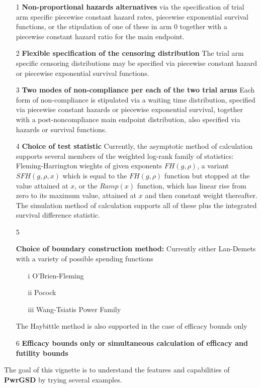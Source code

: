 \documentclass{article}
\begin{document}
\begin{itemize}
  \item[1]{{\bf Non-proportional hazards alternatives}
      via the specification of trial arm specific piecewise constant hazard rates, 
      piecewise exponential survival functions, or the stipulation of one of these
      in arm 0 together with a piecewise constant hazard ratio for the main endpoint.}
  \item[2]{{\bf Flexible specification of the censoring distribution}
      The trial arm specific censoring distributions may be specified via piecewise constant
      hazard or piecewise exponential survival functions.}
  \item[3]{{\bf Two modes of non-compliance per each of the two trial arms}
      Each form of non-compliance is stipulated via a waiting time distribution, specified via
      piecewise constant hazards or piecewise exponential survival, together with a post-noncompliance
      main endpoint distribution, also specified via hazards or survival functions.}      
  \item[4]{{\bf Choice of test statistic}
      Currently, the asymptotic method of calculation supports several members of the weighted log-rank
      family of statistics: Fleming-Harrington wieghts of given exponents $FH(g, \rho)$, a
      variant $SFH(g,\rho,x)$ which is equal to the $FH(g, \rho)$ function but stopped at the value
      attained at $x$, or the $Ramp(x)$ function, which has linear rise from zero to its maximum
      value, attained at $x$ and then constant weight thereafter.  The simulation method of calculation
      supports all of these plus the integrated survival difference statistic.}    
  \item[5]{{\bf Choice of boundary construction method:}
      Currently either Lan-Demets with a variety of possible spending functions
      \begin{itemize}
        \item[i]{O'Brien-Fleming}
        \item[ii]{Pocock}
        \item[iii]{Wang-Tsiatis Power Family}
      \end{itemize}
      The Haybittle method is also supported in the case of efficacy bounds only}
  \item[6]{{\bf Efficacy bounds only or simultaneous calculation of efficacy and futility bounds}}
\end{itemize}

The goal of this vignette is to understand the features and capabilities of {\bf PwrGSD} by
trying several examples. 
\end{document}
